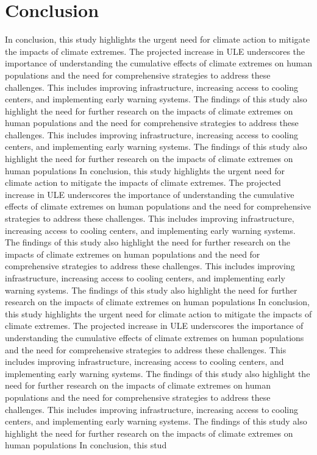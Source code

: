 \documentclass[9pt, twoside, twocolumn]{extarticle}
\begin{document}
\section*{Conclusion}
In conclusion, this study highlights the urgent need for climate action to mitigate the impacts of climate extremes. The projected increase in ULE underscores the importance of understanding the cumulative effects of climate extremes on human populations and the need for comprehensive strategies to address these challenges. This includes improving infrastructure, increasing access to cooling centers, and implementing early warning systems.\cite{IPCC2021} The findings of this study also highlight the need for further research on the impacts of climate extremes on human populations and the need for comprehensive strategies to address these challenges. This includes improving infrastructure, increasing access to cooling centers, and implementing early warning systems.\cite{IPCC2021} The findings of this study also highlight the need for further research on the impacts of climate extremes on human populations  In conclusion, this study highlights the urgent need for climate action to mitigate the impacts of climate extremes. The projected increase in ULE underscores the importance of understanding the cumulative effects of climate extremes on human populations and the need for comprehensive strategies to address these challenges. This includes improving infrastructure, increasing access to cooling centers, and implementing early warning systems.\cite{IPCC2021} The findings of this study also highlight the need for further research on the impacts of climate extremes on human populations and the need for comprehensive strategies to address these challenges. This includes improving infrastructure, increasing access to cooling centers, and implementing early warning systems.\cite{IPCC2021} The findings of this study also highlight the need for further research on the impacts of climate extremes on human populations  In conclusion, this study highlights the urgent need for climate action to mitigate the impacts of climate extremes. The projected increase in ULE underscores the importance of understanding the cumulative effects of climate extremes on human populations and the need for comprehensive strategies to address these challenges. This includes improving infrastructure, increasing access to cooling centers, and implementing early warning systems.\cite{IPCC2021} The findings of this study also highlight the need for further research on the impacts of climate extremes on human populations and the need for comprehensive strategies to address these challenges. This includes improving infrastructure, increasing access to cooling centers, and implementing early warning systems.\cite{IPCC2021} The findings of this study also highlight the need for further research on the impacts of climate extremes on human populations  In conclusion, this stud
\end{document}
